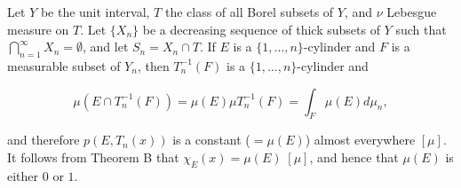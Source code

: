 Let $Y$ be the unit interval, $T$ the class of all Borel subsets of $Y$, and $\nu$ Lebesgue measure on $T$. Let $\{X_n\}$ be a decreasing sequence of thick subsets of $Y$ such that $\bigcap_{n=1}^{\infty} X_n = \emptyset$, and let $S_n = X_n \cap T$. If $E$ is a $\{1, \ldots, n\}$-cylinder and $F$ is a measurable subset of $Y_n$, then $T_n^{-1}(F)$ is a $\{1, \ldots, n\}$-cylinder and

$$\mu(E \cap T_n^{-1}(F)) = \mu(E) \mu T_n^{-1}(F) = \int_F \mu(E) d\mu_n,$$

and therefore $p(E, T_n(x))$ is a constant ($= \mu(E)$) almost everywhere $[\mu]$. It follows from Theorem B that $\chi_E(x) = \mu(E) \; [\mu]$, and hence that $\mu(E)$ is either $0$ or $1$.
